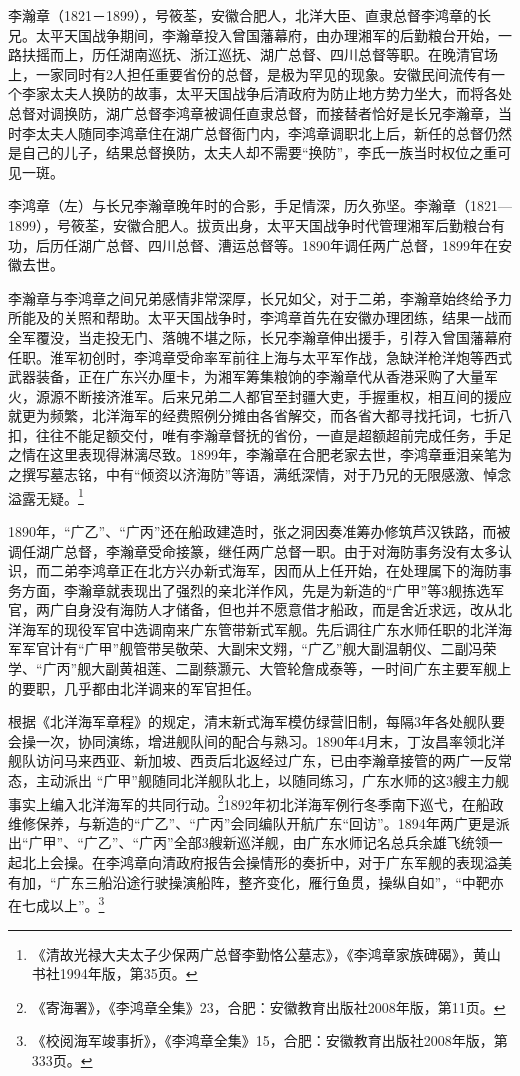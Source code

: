 \documentclass[12pt,UTF8]{ctexbook}
\begin{document}
李瀚章（1821－1899），号筱荃，安徽合肥人，北洋大臣、直隶总督李鸿章的长兄。太平天国战争期间，李瀚章投入曾国藩幕府，由办理湘军的后勤粮台开始，一路扶摇而上，历任湖南巡抚、浙江巡抚、湖广总督、四川总督等职。在晚清官场上，一家同时有2人担任重要省份的总督，是极为罕见的现象。安徽民间流传有一个李家太夫人换防的故事，太平天国战争后清政府为防止地方势力坐大，而将各处总督对调换防，湖广总督李鸿章被调任直隶总督，而接替者恰好是长兄李瀚章，当时李太夫人随同李鸿章住在湖广总督衙门内，李鸿章调职北上后，新任的总督仍然是自己的儿子，结果总督换防，太夫人却不需要“换防”，李氏一族当时权位之重可见一斑。

李鸿章（左）与长兄李瀚章晚年时的合影，手足情深，历久弥坚。李瀚章（1821—1899），号筱荃，安徽合肥人。拔贡出身，太平天国战争时代管理湘军后勤粮台有功，后历任湖广总督、四川总督、漕运总督等。1890年调任两广总督，1899年在安徽去世。

李瀚章与李鸿章之间兄弟感情非常深厚，长兄如父，对于二弟，李瀚章始终给予力所能及的关照和帮助。太平天国战争时，李鸿章首先在安徽办理团练，结果一战而全军覆没，当走投无门、落魄不堪之际，长兄李瀚章伸出援手，引荐入曾国藩幕府任职。淮军初创时，李鸿章受命率军前往上海与太平军作战，急缺洋枪洋炮等西式武器装备，正在广东兴办厘卡，为湘军筹集粮饷的李瀚章代从香港采购了大量军火，源源不断接济淮军。后来兄弟二人都官至封疆大吏，手握重权，相互间的援应就更为频繁，北洋海军的经费照例分摊由各省解交，而各省大都寻找托词，七折八扣，往往不能足额交付，唯有李瀚章督抚的省份，一直是超额超前完成任务，手足之情在这里表现得淋漓尽致。1899年，李瀚章在合肥老家去世，李鸿章垂泪亲笔为之撰写墓志铭，中有“倾资以济海防”等语，满纸深情，对于乃兄的无限感激、悼念溢露无疑。\footnote{《清故光禄大夫太子少保两广总督李勤恪公墓志》，《李鸿章家族碑碣》，黄山书社1994年版，第35页。}

1890年，“广乙”、“广丙”还在船政建造时，张之洞因奏准筹办修筑芦汉铁路，而被调任湖广总督，李瀚章受命接篆，继任两广总督一职。由于对海防事务没有太多认识，而二弟李鸿章正在北方兴办新式海军，因而从上任开始，在处理属下的海防事务方面，李瀚章就表现出了强烈的亲北洋作风，先是为新造的“广甲”等3舰拣选军官，两广自身没有海防人才储备，但也并不愿意借才船政，而是舍近求远，改从北洋海军的现役军官中选调南来广东管带新式军舰。先后调往广东水师任职的北洋海军军官计有“广甲”舰管带吴敬荣、大副宋文翙，“广乙”舰大副温朝仪、二副冯荣学、“广丙”舰大副黄祖莲、二副蔡灏元、大管轮詹成泰等，一时间广东主要军舰上的要职，几乎都由北洋调来的军官担任。

根据《北洋海军章程》的规定，清末新式海军模仿绿营旧制，每隔3年各处舰队要会操一次，协同演练，增进舰队间的配合与熟习。1890年4月末，丁汝昌率领北洋舰队访问马来西亚、新加坡、西贡后北返经过广东，已由李瀚章接管的两广一反常态，主动派出 “广甲”舰随同北洋舰队北上，以随同练习，广东水师的这3艘主力舰事实上编入北洋海军的共同行动。\footnote{《寄海署》，《李鸿章全集》23，合肥：安徽教育出版社2008年版，第11页。}1892年初北洋海军例行冬季南下巡弋，在船政维修保养，与新造的“广乙”、“广丙”会同编队开航广东“回访”。1894年两广更是派出“广甲”、“广乙”、“广丙”全部3艘新巡洋舰，由广东水师记名总兵余雄飞统领一起北上会操。在李鸿章向清政府报告会操情形的奏折中，对于广东军舰的表现溢美有加，“广东三船沿途行驶操演船阵，整齐变化，雁行鱼贯，操纵自如”，“中靶亦在七成以上”。\footnote{《校阅海军竣事折》，《李鸿章全集》15，合肥：安徽教育出版社2008年版，第333页。}
\end{document}
